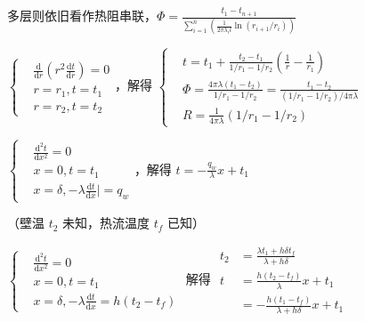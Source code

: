 多层则依旧看作热阻串联，$\Phi = \frac{t_1-t_{n+1}}{\sum_{i=1}^n (\frac{1}{2\pi\lambda_i l}\ln(r_{i+1}/r_i))}$

\divider


$\left\{
    \begin{aligned}
         & \frac{\mathrm{d}}{\mathrm{d}r}\left(r^2  \frac{\mathrm{d}t}{\mathrm{d}r}\right)=0 \\
         & r=r_1,t=t_1                                                                       \\
         & r=r_2,t=t_2
    \end{aligned}
    \right.$，解得 $\left\{
    \begin{aligned}
         & t = t_1 + \frac{t_2-t_1}{1/r_1-1/r_2}\left(\frac{1}{r}-\frac{1}{r_1}\right)                         \\
         & \Phi =\frac{4\pi\lambda\left(t_1-t_2\right)}{1/r_1-1/r_2}=\frac{t_1-t_2}{(1/r_1-1/r_2)/4\pi\lambda} \\
         & R=\frac{1}{4\pi\lambda}(1/r_1-1/r_2)
    \end{aligned}
    \right.$

\divider



$\left\{
    \begin{aligned}
         & \frac{\mathrm{d}^2 t}{\mathrm{d}x^2}=0                       \\
         & x=0,t=t_1                                                    \\
         & x=\delta,-\lambda \frac{\mathrm{d}t}{\mathrm{d}x}\vert = q_w
    \end{aligned}
    \right.$，解得 $t = -\frac{q_w}{\lambda}x+t_1$

（壁温 $t_2$ 未知，热流温度 $t_f$ 已知）

$\left\{
    \begin{aligned}
         & \frac{\mathrm{d}^2 t}{\mathrm{d}x^2}=0                           \\
         & x=0, t=t_1                                                       \\
         & x=\delta , -\lambda \frac{\mathrm{d}t}{\mathrm{d}x} = h(t_2-t_f)
    \end{aligned}
    \right.$ 解得 $
    \begin{aligned}
        t_2 & =\frac{\lambda t_1+h\delta t_f}{\lambda+h\delta} \\
        t   & =\frac{h(t_2-t_f)}{\lambda}x+t_1                 \\
            & =-\frac{h(t_1-t_f)}{\lambda+h\delta}x+t_1
    \end{aligned}
$

